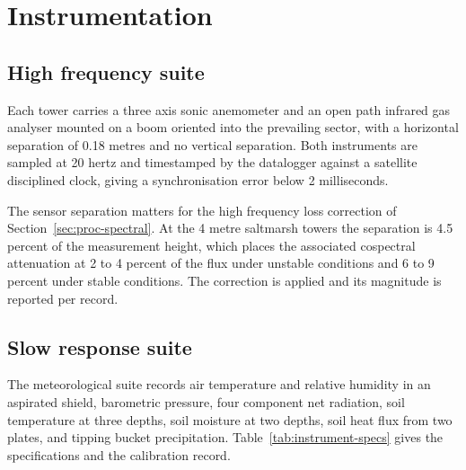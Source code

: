 \section{Instrumentation}
\label{sec:instruments}

\subsection{High frequency suite}
\label{sec:instr-highfreq}

Each tower carries a three axis sonic anemometer and an open path infrared gas
analyser mounted on a boom oriented into the prevailing sector, with a
horizontal separation of 0.18 metres and no vertical separation. Both
instruments are sampled at 20 hertz and timestamped by the datalogger against a
satellite disciplined clock, giving a synchronisation error below 2
milliseconds.

The sensor separation matters for the high frequency loss correction of
Section~\ref{sec:proc-spectral}. At the 4 metre saltmarsh towers the separation
is 4.5 percent of the measurement height, which places the associated cospectral
attenuation at 2 to 4 percent of the flux under unstable conditions and 6 to 9
percent under stable conditions. The correction is applied and its magnitude is
reported per record.

\subsection{Slow response suite}
\label{sec:instr-slow}

The meteorological suite records air temperature and relative humidity in an
aspirated shield, barometric pressure, four component net radiation, soil
temperature at three depths, soil moisture at two depths, soil heat flux from
two plates, and tipping bucket precipitation. Table~\ref{tab:instrument-specs}
gives the specifications and the calibration record.

